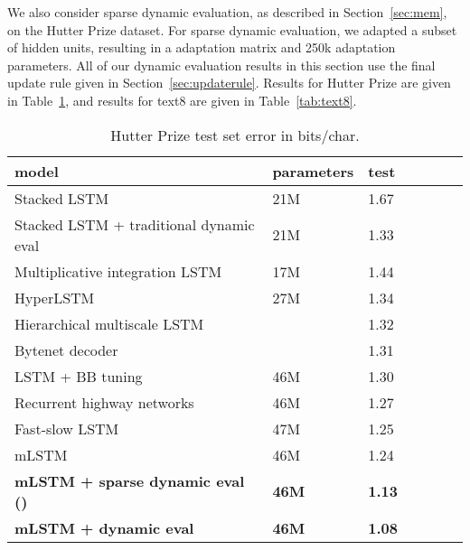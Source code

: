 \documentclass{article} \usepackage{iclr2018_conference,times}
\begin{document}
We also consider sparse dynamic evaluation, as described in Section~\ref{sec:mem}, on the Hutter Prize dataset. For sparse dynamic evaluation, we adapted a subset of  hidden units, resulting in a  adaptation matrix and 250k adaptation parameters. All of our dynamic evaluation results in this section use the final update rule given in Section~\ref{sec:updaterule}. Results for Hutter Prize are given in Table~\ref{tab:hutter}, and results for text8 are given in Table~\ref{tab:text8}.
\begin{table}[tb]
\begin{center} 
\begin{tabular}{  l  l  l  l  l  l  l } \toprule 
model &  parameters & test \\ 
\midrule 
Stacked LSTM \citep{Graves-2013}  & 21M& 1.67 \\ 
Stacked LSTM + traditional dynamic eval \citep{Graves-2013} & 21M &1.33 \\ 
Multiplicative integration LSTM \citep{wu2016} &17M&1.44 \\  
HyperLSTM  \citep{Ha2017} & 27M&1.34\\   
Hierarchical multiscale LSTM \citep{chung2017} & & 1.32 \\  
Bytenet decoder \citep{Kalchbrenner2016}& & 1.31\\  
LSTM + BB tuning \citep{melis2017}& 46M & 1.30\\
Recurrent highway networks \citep{zilly2017} & 46M &1.27\\
Fast-slow LSTM \citep{mujika2017} & 47M & 1.25\\
\midrule 
mLSTM \citep{krause2016} & 46M & 1.24 \\
\textbf{mLSTM + sparse dynamic eval ()} & \textbf{46M} &\textbf{1.13}\\ 
\textbf{mLSTM + dynamic eval } & \textbf{46M} &\textbf{1.08}\\ 
\bottomrule
\end{tabular} 
\end{center}
\caption{Hutter Prize test set error in bits/char.}
\label{tab:hutter}
\end{table}
\end{document}
